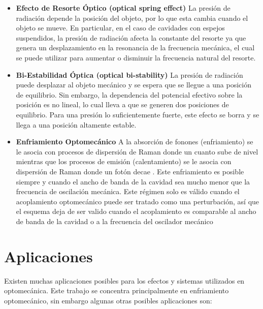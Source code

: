 \documentclass[10pt,a4paper]{report}
\begin{document}
\begin{itemize}
\item \textbf{Efecto de Resorte Óptico (optical spring effect)} La presión de radiación depende la posición del objeto, por lo que esta cambia cuando el objeto se mueve. En particular, en el caso de cavidades con espejos suspendidos, la presión de radiación afecta la constante del resorte ya que genera un desplazamiento en la resonancia de la frecuencia mecánica, el cual se puede utilizar para aumentar o disminuir la frecuencia natural del resorte.\cite{BraginskyPE}

\item \textbf{Bi-Estabilidad Óptica (optical bi-stability)} La presión de radiación puede desplazar al objeto mecánico y se espera que se llegue a una posición de equilibrio. Sin embargo, la dependencia del potencial efectivo sobre la posición es no lineal, lo cual lleva a que se generen dos posiciones de equilibrio. Para una presión lo suficientemente fuerte, este efecto se borra y se llega a una posición altamente estable\cite{DorselOB}.

\item \textbf{Enfriamiento Optomecánico}  A la absorción de fonones (enfriamiento) se le asocia con procesos de dispersión de Raman donde un cuanto sube de nivel mientras que los procesos de emisión (calentamiento) se le asocia con dispersión de Raman donde un fotón decae \cite{LCNooshi}. Este enfriamiento es posible siempre y cuando el ancho de banda de la cavidad sea mucho menor que la frecuencia de oscilación mecánica. \cite{LCNooshi} \cite{MarquardtSC} Este régimen solo es válido cuando el acoplamiento optomecánico puede ser tratado como una perturbación, así que el esquema deja de ser valido cuando el acoplamiento es comparable al ancho de banda de la cavidad o a la frecuencia del oscilador mecánico
\end{itemize}


\section{Aplicaciones}

Existen muchas aplicaciones posibles para los efectos y sistemas utilizados en optomecánica. Este trabajo se concentra principalmente en enfriamiento optomecánico, sin embargo algunas otras posibles aplicaciones son:
\end{document}
